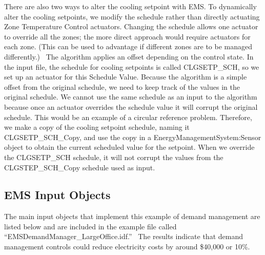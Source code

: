 There are also two ways to alter the cooling setpoint with EMS. To dynamically alter the cooling setpoints, we modify the schedule rather than directly actuating Zone Temperature Control actuators. Changing the schedule allows one actuator to override all the zones; the more direct approach would require actuators for each zone. (This can be used to advantage if different zones are to be managed differently.)~ The algorithm applies an offset depending on the control state. In the input file, the schedule for cooling setpoints is called CLGSETP\_SCH, so we set up an actuator for this Schedule Value. Because the algorithm is a simple offset from the original schedule, we need to keep track of the values in the original schedule. We cannot use the same schedule as an input to the algorithm because once an actuator overrides the schedule value it will corrupt the original schedule. This would be an example of a circular reference problem. Therefore, we make a copy of the cooling setpoint schedule, naming it CLGSETP\_SCH\_Copy, and use the copy in a EnergyManagementSystem:Sensor object to obtain the current scheduled value for the setpoint. When we override the CLGSETP\_SCH schedule, it will not corrupt the values from the CLGSTEP\_SCH\_Copy schedule used as input.

\subsection{EMS Input Objects}\label{ems-input-objects-011}

The main input objects that implement this example of demand management are listed below and are included in the example file called ``EMSDemandManager\_LargeOffice.idf.''~ The results indicate that demand management controls could reduce electricity costs by around \$40,000 or 10\%.

